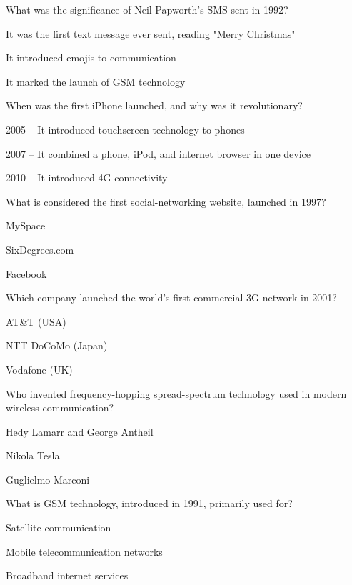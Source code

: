 \begin{enhancedmcq}{What was the significance of Neil Papworth's SMS sent in 1992?}
\item It was the first text message ever sent, reading "Merry Christmas"
\item It introduced emojis to communication
\item It marked the launch of GSM technology

\end{enhancedmcq}
\begin{enhancedmcq}{When was the first iPhone launched, and why was it revolutionary?}
\item 2005 – It introduced touchscreen technology to phones
\item 2007 – It combined a phone, iPod, and internet browser in one device
\item 2010 – It introduced 4G connectivity

\end{enhancedmcq}
\begin{enhancedmcq}{What is considered the first social-networking website, launched in 1997?}
\item MySpace
\item SixDegrees.com
\item Facebook

\end{enhancedmcq}
\begin{enhancedmcq}{Which company launched the world's first commercial 3G network in 2001?}
\item AT&T (USA)
\item NTT DoCoMo (Japan)
\item Vodafone (UK)

\end{enhancedmcq}
\begin{enhancedmcq}{Who invented frequency-hopping spread-spectrum technology used in modern wireless communication?}
\item Hedy Lamarr and George Antheil
\item Nikola Tesla
\item Guglielmo Marconi

\end{enhancedmcq}
\begin{enhancedmcq}{What is GSM technology, introduced in 1991, primarily used for?}
\item Satellite communication
\item Mobile telecommunication networks
\item Broadband internet services

\end{enhancedmcq}
